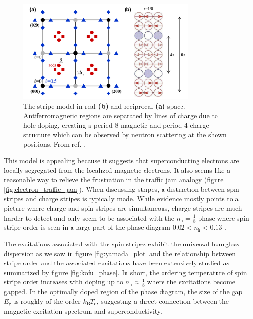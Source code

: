 \begin{figure}
    \centering
    \includegraphics[width=0.8\textwidth]{fig/intro/stripe_model_hucker.png}
    \caption[stripe model hucker]{The stripe model in real \textbf{(b)} and reciprocal \textbf{(a)} space. Antiferromagnetic regions are separated by lines of charge due to hole doping, creating a period-8 magnetic and period-4 charge structure which can be observed by neutron scattering at the shown positions. From ref. \cite{Hucker2012}.}
    \label{fig:stripe_model_hucker}
\end{figure}

This model is appealing because it suggests that superconducting electrons are locally segregated from the localized magnetic electrons. It also seems like a reasonable way to relieve the frustration in the traffic jam analogy (figure \ref{fig:electron_traffic_jam}). When discussing stripes, a distinction between spin stripes and charge stripes is typically made. While evidence mostly points to a picture where charge and spin stripes are simultaneous, charge stripes are much harder to detect and only seem to be associated with the $n_\text{h} = \frac{1}{8}$ phase \cite{Christensen2014, Croft2014,Thampy2014} where spin stripe order is seen in a large part of the phase diagram $0.02 < n_\text{h} < 0.13$ \cite{Julien2003}.

The excitations associated with the spin stripes exhibit the universal hourglass dispersion as we saw in figure \ref{fig:yamada_plot} \cite{Tranquada2004a} and the relationship between stripe order and the associated excitations have been extensively studied as summarized by figure \ref{fig:kofu_phase}. In short, the ordering temperature of spin stripe order increases with doping up to $n_\text{h} \approx \frac{1}{8}$ where the excitations become gapped. In the optimally doped region of the phase diagram, the size of the gap $E_\text{g}$ is roughly of the order $k_\text{B} T_\text{c}$, suggesting a direct connection between the magnetic excitation spectrum and superconductivity.

